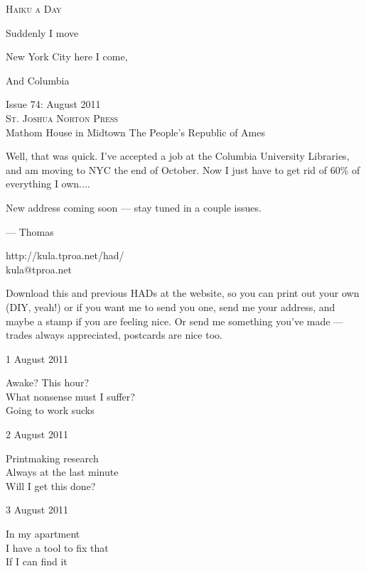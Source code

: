 \documentclass[12pt]{article}
\begin{document}
\begin{center}
{\fontsize{36}{48}\selectfont \textsc{Haiku a Day }}
\end{center}

\vspace*{3.5cm}

{\fontsize{20}{40}\selectfont 

Suddenly I move 

New York City here I come, 

And Columbia


}

\vspace*{5.0cm}
\begin{center}
{\large{Issue 74: August 2011}} \\[5mm]
{\fontsize{8}{8}\selectfont  \textsc{ St. Joshua Norton Press }} \\[1mm]
{\fontsize{6}{6}\selectfont Mathom House in Midtown \textbar The People's Republic of Ames }
\end{center}


\newpage

Well, that was quick. I've accepted a job at the Columbia University Libraries, 
and am moving to NYC the end of October. Now I just have to get rid of 60\% of
everything I own....

New address coming soon --- stay tuned in a couple issues. 

--- Thomas

http://kula.tproa.net/had/ \\
kula@tproa.net

Download this and previous HADs at the website, so you can
print out your own (DIY, yeah!) or if you want me to send
you one, send me your address, and maybe a stamp if you
are feeling nice. Or send me something you've made ---
trades always appreciated, postcards are nice too.

\vfill

1 August 2011

Awake? This hour? \\
What nonsense must I suffer? \\
Going to work sucks

2 August 2011

Printmaking research \\
Always at the last minute \\
Will I get this done?

3 August 2011

In my apartment \\
I have a tool to fix that \\
If I can find it
\end{document}
